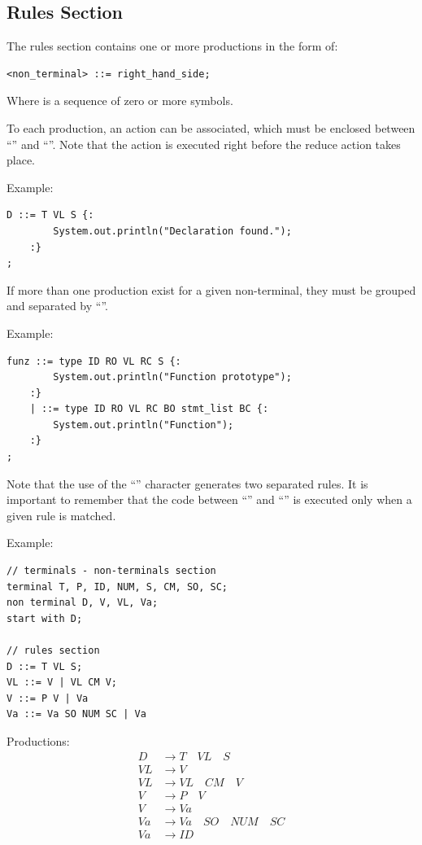 \subsection{Rules Section}
The rules section contains one or more productions in the form of:
\begin{lstlisting}
<non_terminal> ::= right_hand_side;
\end{lstlisting}
Where  is a sequence of zero or more symbols.

To each production, an action can be associated, which must be enclosed between ``\code{\{:}'' and ``\code{:\}}''.
Note that the action is executed right before the reduce action takes place.

Example:
\begin{lstlisting}
D ::= T VL S {:
        System.out.println("Declaration found.");
    :}
;
\end{lstlisting}

If more than one production exist for a given non-terminal, they must be grouped and separated by ``\code{\|}''.

Example:
\begin{lstlisting}
funz ::= type ID RO VL RC S {:
        System.out.println("Function prototype");
    :}
    | ::= type ID RO VL RC BO stmt_list BC {:
        System.out.println("Function");
    :}
;
\end{lstlisting}
Note that the use of the ``\code{\|}'' character generates two separated rules.
It is important to remember that the code between ``\code{\{:}'' and ``\code{:\}}'' is executed only when a given rule is matched.

Example:
\begin{lstlisting}[frame=single]
// terminals - non-terminals section
terminal T, P, ID, NUM, S, CM, SO, SC;
non terminal D, V, VL, Va;
start with D;

// rules section
D ::= T VL S;
VL ::= V | VL CM V;
V ::= P V | Va
Va ::= Va SO NUM SC | Va
\end{lstlisting}
Productions:
\begin{align*}
    D &\to T \quad VL \quad S \\
    VL &\to V \\
    VL &\to VL \quad CM \quad V \\
    V &\to P \quad V \\
    V &\to Va \\
    Va &\to Va \quad SO \quad NUM \quad SC \\
    Va &\to ID
\end{align*}

